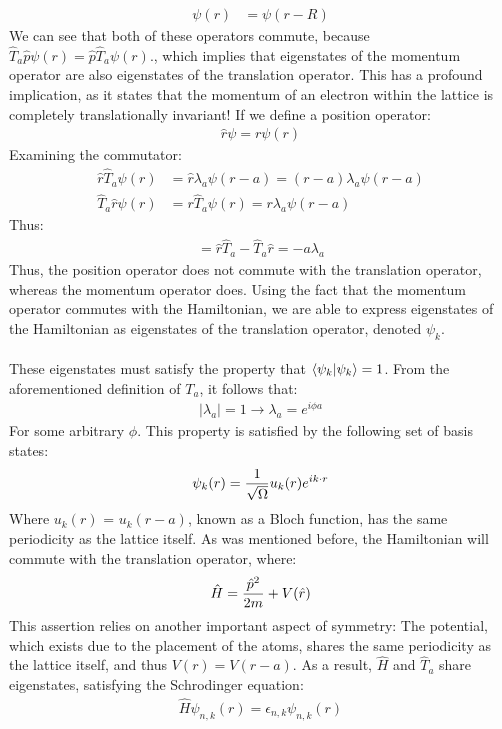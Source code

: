 \documentclass{article}
\begin{document}
\begin{align*}
	\psi(r) &= \psi(r - R)
\end{align*}
We can see that both of these operators commute, because $\hat T_a\hat p\psi(r) = \hat p\hat T_a\psi(r)$., which implies that eigenstates of the momentum operator are also eigenstates of the translation operator.  This has a profound implication, as it states that the momentum of an electron within the lattice is completely translationally invariant!  If we define a position operator:
\begin{align*}
	\hat{r}\psi = r\psi(r)
\end{align*}
Examining the commutator:
\begin{align*}
	\hat{r}\hat T_a\psi(r) &= \hat r\lambda_a\psi(r - a) = (r - a)\lambda_a\psi(r - a)\\
	\hat T_a \hat{r} \psi(r) &= r\hat T_a \psi(r) = r\lambda_a\psi(r - a)
\end{align*}
Thus:
\begin{align*}
	[\hat r, \hat T_a] = \hat{r}\hat T_a - \hat T_a \hat{r} = -a\lambda_a
\end{align*}
Thus, the position operator does not commute with the translation operator, whereas the momentum operator does.  Using the fact that the momentum operator commutes with the Hamiltonian, we are able to express eigenstates of the Hamiltonian as eigenstates of the translation operator, denoted $\psi_k$.\\\\
These eigenstates must satisfy the property that $\braket{\psi_k} = 1$.  From the aforementioned definition of $T_a$, it follows that:
\begin{align*}
	|\lambda_a| = 1 \to \lambda_a = e^{i\phi a}
\end{align*}
For some arbitrary $\phi$.  This property is satisfied by the following set of basis states:
\begin{align*}
	\psi_k(r) = {1\over\sqrt{\Omega}}u_k(r)e^{ik\cdot r}
\end{align*}
Where $u_k(r)$ = $u_k(r - a)$, known as a Bloch function, has the same periodicity as the lattice itself.  As was mentioned before, the Hamiltonian will commute with the translation operator, where:
\begin{align*}
	\hat H = {\hat p^2\over 2m} + V(\hat r)
\end{align*}
This assertion relies on another important aspect of symmetry:  The potential, which exists due to the placement of the atoms, shares the same periodicity as the lattice itself, and thus $V(r) = V(r - a)$.  As a result, $\hat H$ and $\hat T_a$ share eigenstates, satisfying the Schrodinger equation:
\begin{align*}
\hat H\psi_{n,k}(r) = \epsilon_{n,k}\psi_{n,k}(r)
\end{align*}
\\\\
\end{document}
